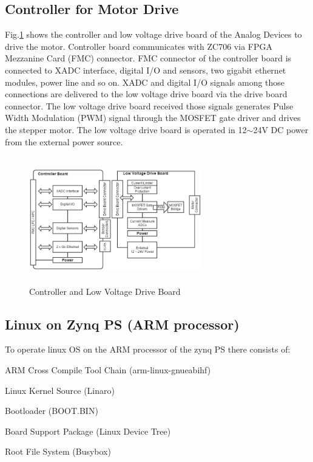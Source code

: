 \documentclass[a4paper,
              ]{jacow}
\begin{document}
\subsection{Controller for Motor Drive}
Fig.\ref{controller} shows the controller and low voltage drive board of the Analog Devices to drive the motor. Controller board communicates with ZC706 via FPGA Mezzanine Card (FMC) connector. FMC connector of the controller board is connected to XADC interface, digital I/O and sensors, two gigabit ethernet modules, power line and so on. XADC and digital I/O signals among those connections are delivered to the low voltage drive board via the drive board connector. The low voltage drive board received those signals generates Pulse Width Modulation (PWM) signal through the MOSFET gate driver and drives the stepper motor. The low voltage drive board is operated in 12${\sim}$24V DC power from the external power source.

\begin{figure}[!htb]
	\centering
	\includegraphics*[width=75mm, height=55mm]{WEPGF124f2}
	\caption{Controller and Low Voltage Drive Board}
	\label{controller}
\end{figure}

\subsection{Linux on Zynq PS (ARM processor)}
To operate linux OS on the ARM processor of the zynq PS there consists of:
\begin{Itemize}
	\item ARM Cross Compile Tool Chain (arm-linux-gnueabihf)
	\item Linux Kernel Source (Linaro)
	\item Bootloader (BOOT.BIN)
	\item Board Support Package (Linux Device Tree)
	\item Root File System (Busybox)
\end{Itemize}
\end{document}
